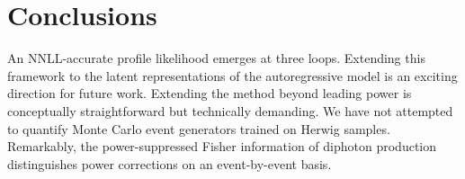 \section{Conclusions}\label{sec:conclusions}

An NNLL-accurate profile likelihood emerges at three loops. Extending
this framework to the latent representations of the autoregressive model
is an exciting direction for future work. Extending the method beyond
leading power is conceptually straightforward but technically demanding.
We have not attempted to quantify Monte Carlo event generators trained
on Herwig samples. Remarkably, the power-suppressed Fisher information
of diphoton production distinguishes power corrections on an
event-by-event basis.

